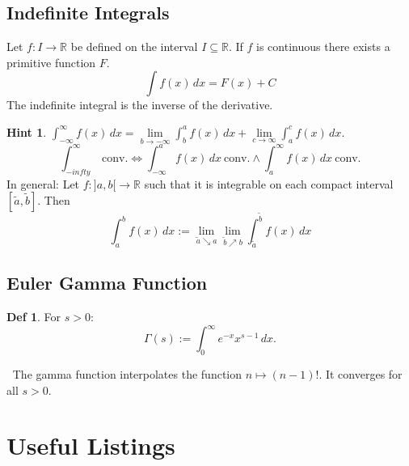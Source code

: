 \documentclass[a4paper, 10pt]{article}
\theoremstyle{definition}
\newtheorem*{definition}{Def}
\newtheorem*{note_wrapper}{Hint}
\theoremstyle{named}
\newenvironment{note}%
    {\begin{mdframed}[style=trick]\begin{note_wrapper}}%
    {\end{note_wrapper}\end{mdframed}}
\newcommand{\R}{\mathbb{R}}
\begin{document}
\subsection{Indefinite Integrals}
Let $f: I \to \R$ be defined on the interval $I \subseteq \R$. If $f$ is continuous there exists a primitive function $F$.
$$\int f(x) \,dx = F(x) + C$$
The indefinite integral is the inverse of the derivative.

\begin{note}
    $\int_{-\infty}^\infty f(x) \,dx = \lim\limits_{b \to - \infty} \int_b^a f(x) \,dx + \lim\limits_{c \to \infty} \int_a^c f(x) \,dx$.
    $$\int_{-infty}^\infty \ \text{conv.} \iff \int_{-\infty}^a f(x) \,dx \ \text{conv.} \land \int_a^\infty f(x) \,dx \ \text{conv.}$$
    In general: Let $f: ]a, b[ \to \R$ such that it is integrable on each compact interval $[\tilde{a}, \tilde{b}]$. Then 
    $$\int_a^b f(x) \,dx := \lim\limits_{\tilde{a} \searrow a}\lim\limits_{\tilde{b} \nearrow b} \int_{\tilde{a}}^{\tilde{b}} f(x) \,dx$$
\end{note}

\subsection{Euler Gamma Function}
\begin{definition}
    For $s > 0$:
    $$\Gamma(s) := \int_0^\infty e^{-x}x^{s - 1} \,dx.$$
\end{definition}
$\ $ \newline The gamma function interpolates the function $n \mapsto (n-1)!$. It converges for all $s > 0$.
\pagebreak

\section*{Useful Listings}
\end{document}
